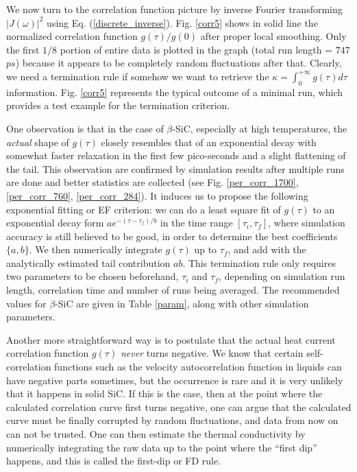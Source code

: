We now turn to the correlation function picture by inverse Fourier
transforming $|{J}(\omega)|^2$ using Eq.  (\ref{discrete_inverse}).
Fig. \ref{corr5} shows in solid line the normalized correlation
function $g(\tau)/g(0)$ after proper local smoothing.  Only the first
$1/8$ portion of entire data is plotted in the graph (total run length
= $747$ $ps$) because it appears to be completely random fluctuations
after that.  Clearly, we need a termination rule if somehow we want to
retrieve the $\kappa = \int_0^{+\infty} g(\tau) d\tau$ information.
Fig. \ref{corr5} represents the typical outcome of a minimal run,
which provides a test example for the termination criterion.

One observation is that in the case of $\beta$-SiC, especially at high
temperatures, the {\em actual} shape of $g(\tau)$ closely resembles
that of an exponential decay with somewhat faster relaxation in the
first few pico-seconds and a slight flattening of the tail. This
observation are confirmed by simulation results after multiple runs
are done and better statistics are collected (see Fig.
\ref{per_corr_1700}, \ref{per_corr_760}, \ref{per_corr_284}).  It
induces us to propose the following exponential fitting or EF
criterion: we can do a least square fit of $g(\tau)$ to an exponential
decay form $ae^{-(\tau-\tau_f)/b}$ in the time range $[\tau_i,
\tau_f]$, where simulation accuracy is still believed to be good, in
order to determine the best coefficients $\{a, b\}$.  We then
numerically integrate $g(\tau)$ up to $\tau_f$, and add with the
analytically estimated tail contribution $ab$. This termination rule
only requires two parameters to be chosen beforehand, $\tau_i$ and
$\tau_f$, depending on simulation run length, correlation time and
number of runs being averaged. The recommended values for $\beta$-SiC
are given in Table \ref{param}, along with other simulation
parameters.

Another more straightforward way is to postulate that the actual heat
current correlation function $g(\tau)$ {\em never} turns negative. We
know that certain self-correlation functions such as the velocity
autocorrelation function in liquids can have negative parts sometimes,
but the occurrence is rare and it is very unlikely that it happens in
solid SiC. If this is the case, then at the point where the calculated
correlation curve first turns negative, one can argue that the
calculated curve must be finally corrupted by random fluctuations, and
data from now on can not be trusted. One can then estimate the thermal
conductivity by numerically integrating the raw data up to the point
where the ``first dip'' happens, and this is called the first-dip or
FD rule.

